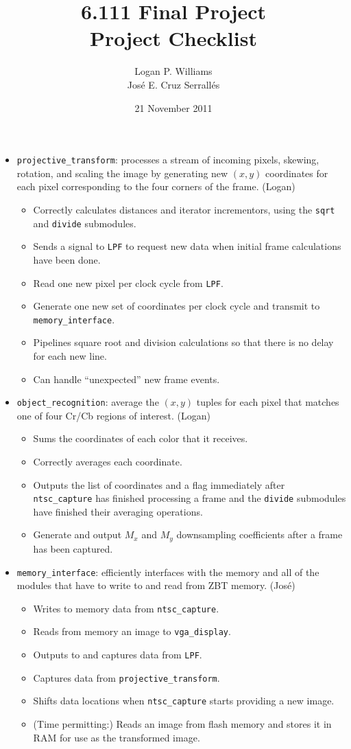 \documentclass{article}
\title{6.111 Final Project\\Project Checklist}
\date{21 November 2011}
\author{Logan P. Williams\\Jos\'{e} E. Cruz Serrall\'{e}s}
\begin{document}
\maketitle

\begin{itemize}
\item[] {\tt projective\_transform}: processes a stream of incoming pixels, skewing, rotation, and scaling the image by generating new $(x,y)$ coordinates for each pixel corresponding to the four corners of the frame. (Logan)
	\begin{itemize}
	\item Correctly calculates distances and iterator incrementors, using the {\tt sqrt} and {\tt divide} submodules. 
	\item Sends a signal to {\tt LPF} to request new data when initial frame calculations have been done.
	\item Read one new pixel per clock cycle from {\tt LPF}.
	\item Generate one new set of coordinates per clock cycle and transmit to {\tt memory\_interface}.
	\item Pipelines square root and division calculations so that there is no delay for each new line.
	\item Can handle ``unexpected'' new frame events.
	\end{itemize}

\item[] {\tt object\_recognition}: average the $(x,y)$ tuples for each pixel that matches one of four Cr/Cb regions of interest. (Logan)
	\begin{itemize}
	\item Sums the coordinates of each color that it receives.
	\item Correctly averages each coordinate.
	\item Outputs the list of coordinates and a flag immediately after {\tt ntsc\_capture} has finished processing a frame and the {\tt divide} submodules have finished their averaging operations.
	\item Generate and output $M_x$ and $M_y$ downsampling coefficients after a frame has been captured.
	\end{itemize}

\item[] {\tt memory\_interface}: efficiently interfaces with the memory and all of the modules that have to write to and read from ZBT memory. (Jos\'{e})
	\begin{itemize}
	\item Writes to memory data from {\tt ntsc\_capture}.
	\item Reads from memory an image to {\tt vga\_display}.
	\item Outputs to and captures data from {\tt LPF}.
	\item Captures data from {\tt projective\_transform}.
	\item Shifts data locations when {\tt ntsc\_capture} starts providing a new image.
	\item (Time permitting:) Reads an image from flash memory and stores it in RAM for use as the transformed image.
	\end{itemize}


\end{itemize}
\end{document}
